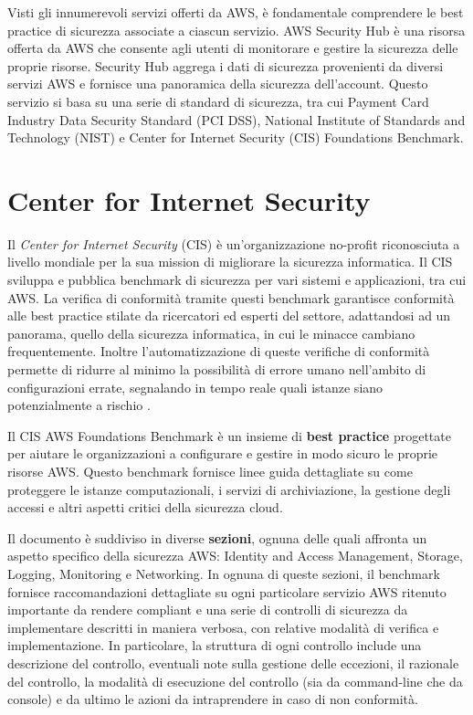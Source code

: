 Visti gli innumerevoli servizi offerti da AWS, è fondamentale comprendere le best practice di sicurezza associate a ciascun servizio. AWS Security Hub è una risorsa offerta da AWS che consente agli utenti di monitorare e gestire la sicurezza delle proprie risorse. Security Hub aggrega i dati di sicurezza provenienti da diversi servizi AWS e fornisce una panoramica della sicurezza dell'account. Questo servizio si basa su una serie di standard di sicurezza, tra cui Payment Card Industry Data Security Standard (PCI DSS), National Institute of Standards and Technology (NIST) e Center for Internet Security (CIS) Foundations Benchmark.

\section{Center for Internet Security}
\label{sec:cis}

Il \textit{Center for Internet Security} (CIS) è un'organizzazione no-profit riconosciuta a livello mondiale per la sua mission di migliorare la sicurezza informatica. Il CIS sviluppa e pubblica benchmark di sicurezza per vari sistemi e applicazioni, tra cui AWS. La verifica di conformità tramite questi benchmark garantisce conformità alle best practice stilate da ricercatori ed esperti del settore, adattandosi ad un panorama, quello della sicurezza informatica, in cui le minacce cambiano frequentemente. Inoltre l'automatizzazione di queste verifiche di conformità permette di ridurre al minimo la possibilità di errore umano nell'ambito di configurazioni errate, segnalando in tempo reale quali istanze siano potenzialmente a rischio \cite{10602274}.

Il CIS AWS Foundations Benchmark è un insieme di \textbf{best practice} progettate per aiutare le organizzazioni a configurare e gestire in modo sicuro le proprie risorse AWS. Questo benchmark fornisce linee guida dettagliate su come proteggere le istanze computazionali, i servizi di archiviazione, la gestione degli accessi e altri aspetti critici della sicurezza cloud.

Il documento è suddiviso in diverse \textbf{sezioni}, ognuna delle quali affronta un aspetto specifico della sicurezza AWS: Identity and Access Management, Storage, Logging, Monitoring e Networking. In ognuna di queste sezioni, il benchmark fornisce raccomandazioni dettagliate su ogni particolare servizio AWS ritenuto importante da rendere compliant e una serie di controlli di sicurezza da implementare descritti in maniera verbosa, con relative modalità di verifica e implementazione. In particolare, la struttura di ogni controllo include una descrizione del controllo, eventuali note sulla gestione delle eccezioni, il razionale del controllo, la modalità di esecuzione del controllo (sia da command-line che da console) e da ultimo le azioni da intraprendere in caso di non conformità. 

